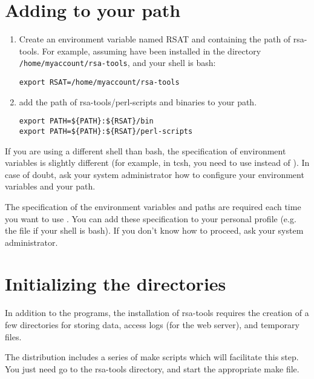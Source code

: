 \documentclass{article}
\begin{document}
\section{Adding \RSAT to your path}

\begin{enumerate}

\item Create an environment variable named RSAT and containing the
path of rsa-tools. For example, assuming \RSAT have been installed in
the directory \texttt{/home/myaccount/rsa-tools}, and your shell is
bash:

\begin{verbatim}
export RSAT=/home/myaccount/rsa-tools
\end{verbatim}

\item add the path of rsa-tools/perl-scripts and binaries to your path.

\begin{verbatim}
export PATH=${PATH}:${RSAT}/bin
export PATH=${PATH}:${RSAT}/perl-scripts
\end{verbatim}

\end{enumerate}

If you are using a different shell than bash, the specification of
environment variables is slightly different (for example, in tcsh, you
need to use  instead of ). In case of
doubt, ask your system administrator how to configure your environment
variables and your path.

The specification of the environment variables and paths are required
each time you want to use \RSAT. You can add these specification to
your personal profile (e.g. the  file if your shell is
bash). If you don't know how to proceed, ask your system
administrator.



\section{Initializing the directories}

In addition to the programs, the installation of rsa-tools requires
the creation of a few directories for storing data, access logs (for
the web server), and temporary files.  

The distribution includes a series of make scripts which will
facilitate this step. You just need go to the rsa-tools directory, and
start the appropriate make file.
\end{document}
